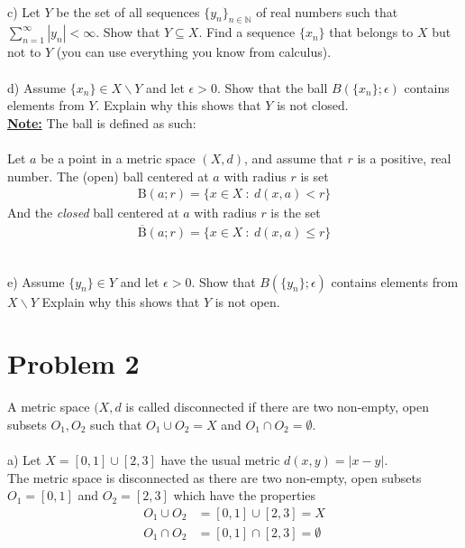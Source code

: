 \documentclass[12pt,letterpaper]{article}
\begin{document}
 
 \noindent \\
 c)  Let $Y$ be the set of all sequences $ \{y_n\}_{n\in\mathbb{N}}$ of real numbers such that $\sum_{n=1}^{\infty} |y_n| < \infty$. Show that $Y \subseteq X$. Find a sequence $\{x_n\}$ that belongs to $X$ but not to $Y$ (you can use everything you know from calculus).\\
 
 
 
 \noindent \\
d) Assume $\{x_n\} \in X \backslash Y$ and let $\epsilon > 0$. Show that the ball $B(\{x_n\}; \epsilon)$ contains elements from $Y$. Explain why this shows that  $Y$ is not closed.\\
 
 
 \textbf{\uline{Note:}} The ball is defined as such:\\
 \noindent \\ Let $a$ be a point in a metric space $(X,d)$, and assume that $r$ is a positive, real number. The (open) ball centered at $a$ with radius $r$ is set 
 \begin{align*}
 	\text{B}(a;r) = \{x\in X \ : \ d(x,a) <r   \}
 \end{align*}
 And the \emph{closed} ball centered at $a$ with radius $r$ is the set
 \begin{align*}
 	\overline{\text{B}}(a;r) = \{x\in X \ : \ d(x,a) \le r   \}
 \end{align*}
 
 
 
 \noindent \\
e) Assume $\{y_n\}\in Y$ and let $\epsilon >0$. Show that $B(\{y_n\};\epsilon)$ contains elements from $X \backslash Y$ Explain why this shows that $Y$ is not open. \\
 


 
 
\section*{Problem 2}

A metric space $(X,d$ is called disconnected if there are two non-empty, open subsets $O_1, O_2$ such that $O_1 \cup O_2 = X$ and $O_1 \cap O_2 = \emptyset$. \\
\noindent \\
a) Let $X = [0,1] \cup [2,3]$ have the usual metric $d(x,y) = |x-y|$. \\
The metric space is disconnected as there are two non-empty, open subsets $O_1 = [0,1]$ and $O_2 = [2,3]$ which have the properties 
\begin{align*}
	O_1 \cup O_2  &= [0,1] \cup [2,3] = X \\
	O_1 \cap O_2  &= [0,1] \cap [2,3]  = \emptyset
\end{align*}
\end{document}
